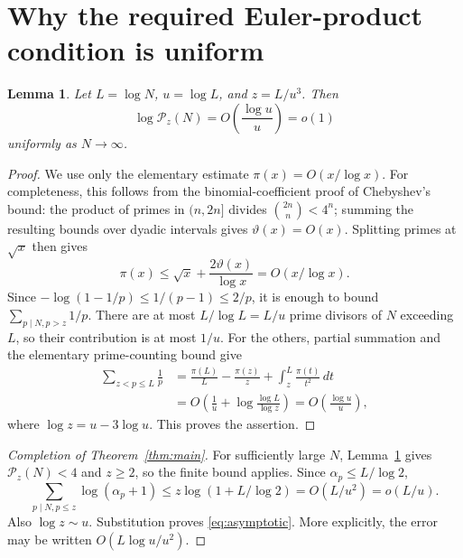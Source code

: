 \documentclass[11pt,a4paper]{article}
\newtheorem{lemma}[theorem]{Lemma}
\theoremstyle{remark}\newtheorem*{remark}{Remark}
\begin{document}
\section{Why the required Euler-product condition is uniform}
\begin{lemma}\label{lem:tail}
Let $L=\log N$, $u=\log L$, and $z=L/u^3$. Then
\[
\log\mathcal P_z(N)=O\!\left(\frac{\log u}{u}\right)=o(1)
\]
uniformly as $N\to\infty$.
\end{lemma}
\begin{proof}
We use only the elementary estimate $\pi(x)=O(x/\log x)$. For completeness, this follows from the binomial-coefficient proof of Chebyshev's bound: the product of primes in $(n,2n]$ divides $\binom{2n}{n}<4^n$; summing the resulting bounds over dyadic intervals gives $\vartheta(x)=O(x)$. Splitting primes at $\sqrt x$ then gives
\[
\pi(x)\le\sqrt x+\frac{2\vartheta(x)}{\log x}=O(x/\log x).
\]
Since $-\log(1-1/p)\le1/(p-1)\le2/p$, it is enough to bound $\sum_{p\mid N,p>z}1/p$.
There are at most $L/\log L=L/u$ prime divisors of $N$ exceeding $L$, so their contribution is at most $1/u$.
For the others, partial summation and the elementary prime-counting bound give
\[
\begin{aligned}
\sum_{z<p\le L}\frac1p
&=\frac{\pi(L)}{L}-\frac{\pi(z)}z+
\int_z^L\frac{\pi(t)}{t^2}\,dt\\
&=O\!\left(\frac1u+\log\frac{\log L}{\log z}\right)
=O\!\left(\frac{\log u}{u}\right),
\end{aligned}
\]
where $\log z=u-3\log u$. This proves the assertion.
\end{proof}

\begin{proof}[Completion of Theorem~\ref{thm:main}]
For sufficiently large $N$, Lemma~\ref{lem:tail} gives $\mathcal P_z(N)<4$ and $z\ge2$, so the finite bound applies. Since $\alpha_p\le L/\log2$,
\[
\sum_{p\mid N,p\le z}\log(\alpha_p+1)
\le z\log(1+L/\log2)=O(L/u^2)=o(L/u).
\]
Also $\log z\sim u$. Substitution proves \eqref{eq:asymptotic}. More explicitly, the error may be written $O(L\log u/u^2)$.
\end{proof}
\end{document}
